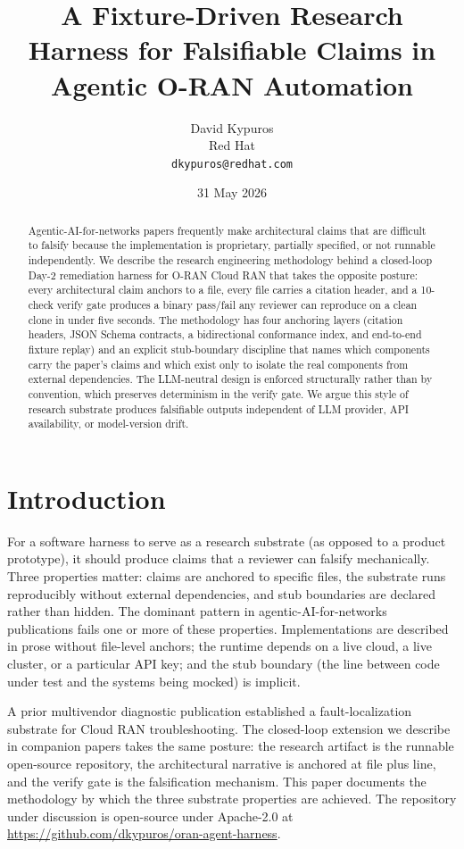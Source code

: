 \documentclass[twocolumn,10pt,a4paper]{article}
\title{A Fixture-Driven Research Harness for Falsifiable Claims in Agentic O-RAN Automation}
\author{David Kypuros \\
\small Red Hat \\
\small \texttt{dkypuros@redhat.com}}
\date{31 May 2026}
\begin{document}
\maketitle

\begin{abstract}
Agentic-AI-for-networks papers frequently make architectural claims that are difficult to falsify because the implementation is proprietary, partially specified, or not runnable independently. We describe the research engineering methodology behind a closed-loop Day-2 remediation harness for O-RAN Cloud RAN that takes the opposite posture: every architectural claim anchors to a file, every file carries a citation header, and a 10-check verify gate produces a binary pass/fail any reviewer can reproduce on a clean clone in under five seconds. The methodology has four anchoring layers (citation headers, JSON Schema contracts, a bidirectional conformance index, and end-to-end fixture replay) and an explicit stub-boundary discipline that names which components carry the paper's claims and which exist only to isolate the real components from external dependencies. The LLM-neutral design is enforced structurally rather than by convention, which preserves determinism in the verify gate. We argue this style of research substrate produces falsifiable outputs independent of LLM provider, API availability, or model-version drift.
\end{abstract}

\section{Introduction}

For a software harness to serve as a research substrate (as opposed to a product prototype), it should produce claims that a reviewer can falsify mechanically. Three properties matter: claims are anchored to specific files, the substrate runs reproducibly without external dependencies, and stub boundaries are declared rather than hidden. The dominant pattern in agentic-AI-for-networks publications fails one or more of these properties. Implementations are described in prose without file-level anchors; the runtime depends on a live cloud, a live cluster, or a particular API key; and the stub boundary (the line between code under test and the systems being mocked) is implicit.

A prior multivendor diagnostic publication \cite{multivendor_blog_2026} established a fault-localization substrate for Cloud RAN troubleshooting. The closed-loop extension we describe in companion papers takes the same posture: the research artifact is the runnable open-source repository, the architectural narrative is anchored at file plus line, and the verify gate is the falsification mechanism. This paper documents the methodology by which the three substrate properties are achieved. The repository under discussion is open-source under Apache-2.0 at \url{https://github.com/dkypuros/oran-agent-harness}.
\end{document}
